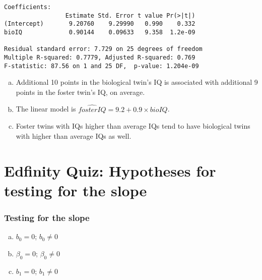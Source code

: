 \documentclass[slidestop,compress,mathserif]{beamer}
\begin{document}

\begin{frame}[fragile]
\frametitle{}


{\footnotesize
\begin{verbatim}
Coefficients:
                 Estimate Std. Error t value Pr(>|t|)    
(Intercept)       9.20760    9.29990   0.990    0.332    
bioIQ             0.90144    0.09633   9.358  1.2e-09

Residual standard error: 7.729 on 25 degrees of freedom
Multiple R-squared: 0.7779,	Adjusted R-squared: 0.769 
F-statistic: 87.56 on 1 and 25 DF,  p-value: 1.204e-09 
\end{verbatim}
}

\begin{enumerate}[(a)]
\item Additional 10 points in the biological twin's IQ is associated with additional 9 points in the foster twin's IQ, on average.
\item The linear model is $\widehat{fosterIQ} = 9.2 + 0.9 \times bioIQ$.
\item Foster twins with IQs higher than average IQs tend to have biological twins with higher than average IQs as well.
\end{enumerate}

\end{frame}


\section{Edfinity Quiz: Hypotheses for testing for the slope}  %


\begin{frame}
\frametitle{Testing for the slope}


\begin{enumerate}[(a)]
\item {} $b_0 = 0$;  $b_0 \ne 0$ 
\item {} $\beta_0 = 0$;  $\beta_0 \ne 0$ 
\item {} $b_1 = 0$;  $b_1 \ne 0$ 
\end{enumerate}

\end{frame}
\end{document}
